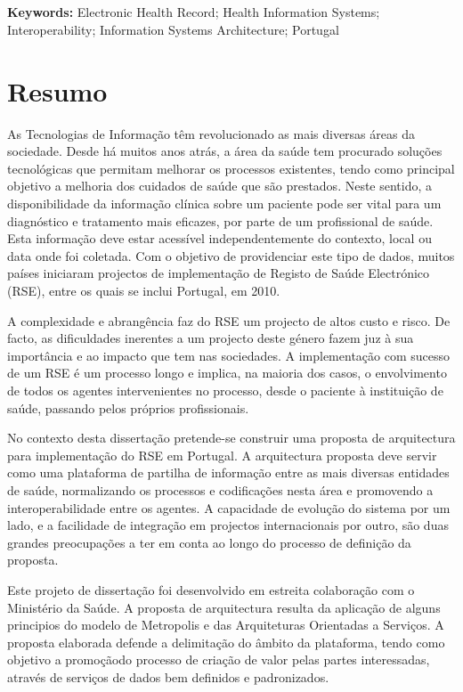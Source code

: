 \section*{}
\textbf{Keywords:} Electronic Health Record; Health Information Systems; Interoperability; Information Systems Architecture; Portugal

\chapter*{Resumo}

As Tecnologias de Informação têm revolucionado as mais diversas áreas da sociedade. Desde há muitos anos atrás, a área da saúde tem procurado soluções tecnológicas que permitam melhorar os processos existentes, tendo como principal objetivo a melhoria dos cuidados de saúde que são prestados. Neste sentido, a disponibilidade da informação clínica sobre um paciente pode ser vital para um diagnóstico e tratamento mais eficazes, por parte de um profissional de saúde. Esta informação deve estar acessível independentemente do contexto, local ou data onde foi coletada. Com o objetivo de providenciar este tipo de dados, muitos países iniciaram projectos de implementação de Registo de Saúde Electrónico (RSE), entre os quais se inclui Portugal, em 2010. 

A complexidade e abrangência faz do RSE um projecto de altos custo e risco. De facto, as dificuldades inerentes a um projecto deste género fazem juz à sua importância e ao impacto que tem nas sociedades. A implementação com sucesso de um RSE é um processo longo e implica, na maioria dos casos, o envolvimento de todos os agentes intervenientes no processo, desde o paciente à instituição de saúde, passando pelos próprios profissionais.

No contexto desta dissertação pretende-se construir uma proposta de arquitectura para implementação do RSE em Portugal. A arquitectura proposta deve servir como uma plataforma de partilha de informação entre as mais diversas entidades de saúde, nor\-ma\-li\-zan\-do os processos e codificações nesta área e promovendo a interoperabilidade entre os agentes. A capacidade de evolução do sistema por um lado, e a facilidade de integração em projectos internacionais por outro, são duas grandes preocupações a ter em conta ao longo do processo de definição da proposta.

Este projeto de dissertação foi desenvolvido em estreita colaboração com o Ministério da Saúde. A proposta de arquitectura resulta da aplicação de alguns principios do modelo de Metropolis e das Arquiteturas Orientadas a Serviços. A proposta elaborada defende a delimitação do âmbito da plataforma, tendo como objetivo a promoçãodo processo de criação de valor pelas partes interessadas, através de serviços de dados bem definidos e padronizados.

